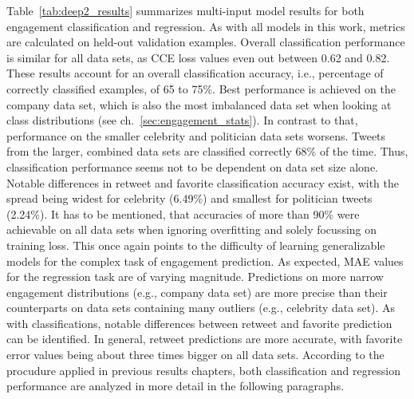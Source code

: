 Table~\ref{tab:deep2_results} summarizes multi-input model results for both
engagement classification and regression.
As with all models in this work, metrics are calculated on held-out validation
examples.
Overall classification performance is similar for all data sets, as CCE loss values
even out between 0.62 and 0.82.
These results account for an overall classification accuracy, i.e., percentage
of correctly classified examples, of 65 to 75\%.
Best performance is achieved on the company data set, which is also the most
imbalanced data set when looking at class distributions (see ch.~\ref{sec:engagement_stats}).
In contrast to that, performance on the smaller celebrity and politician data sets
worsens.
Tweets from the larger, combined data sets are classified correctly 68\% of the
time.
Thus, classification performance seems not to be dependent on data set size alone.
Notable differences in retweet and favorite classification accuracy exist,
with the spread being widest for celebrity (6.49\%) and smallest for
politician tweets (2.24\%).
It has to be mentioned, that accuracies of more than 90\% were achievable on all
data sets when ignoring overfitting and solely focussing on training loss.
This once again points to the difficulty of learning generalizable models for
the complex task of engagement prediction.
As expected, MAE values for the regression task are of varying magnitude.
Predictions on more narrow engagement distributions (e.g., company data set)
are more precise than their counterparts on data sets containing many outliers
(e.g., celebrity data set).
As with classifications, notable differences between retweet and favorite prediction
can be identified.
In general, retweet predictions are more accurate, with favorite error values
being about three times bigger on all data sets.
According to the procudure applied in previous results chapters, both classification
and regression performance are analyzed in more detail in the following paragraphs.

